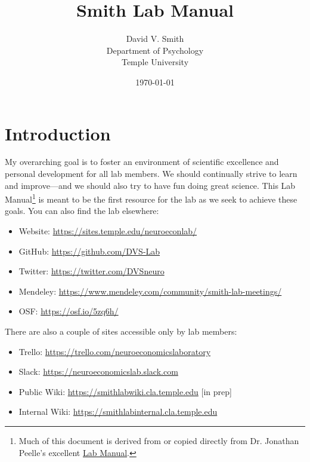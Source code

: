 \documentclass[letterpaper,12pt,oneside]{memoir}
\begin{document}
\title{Smith Lab Manual}
\author{David V. Smith\\Department of Psychology\\Temple University}
\date{\today}


\maketitle

\pagestyle{titlingpage}


\cleardoublepage
\frontmatter
\tableofcontents
\cleardoublepage

\mainmatter

\pagestyle{headings}

\chapter{Introduction}

My overarching goal is to foster an environment of scientific excellence and personal development for all lab members. We should continually strive to learn and improve---and we should also try to have fun doing great science. This Lab Manual\footnote{Much of this document is derived from or copied directly from Dr. Jonathan Peelle's excellent \href{https://github.com/jpeelle/peellelab\_manual/}{Lab Manual}.} is meant to be the first resource for the lab as we seek to achieve these goals. You can also find the lab elsewhere:

\begin{itemize}[noitemsep]
\item Website: \url{https://sites.temple.edu/neuroeconlab/}
\item GitHub: \url{https://github.com/DVS-Lab}
\item Twitter: \url{https://twitter.com/DVSneuro}
\item Mendeley: \url{https://www.mendeley.com/community/smith-lab-meetings/} 
\item OSF: \url{https://osf.io/5zq6h/}
\end{itemize}

\noindent There are also a couple of sites accessible only by lab members:

\begin{itemize}[noitemsep]
\item Trello: \url{https://trello.com/neuroeconomicslaboratory}
\item Slack: \url{https://neuroeconomicslab.slack.com}
\item Public Wiki: \url{https://smithlabwiki.cla.temple.edu} [in prep]
\item Internal Wiki: \url{https://smithlabinternal.cla.temple.edu}
\end{itemize}
\end{document}
